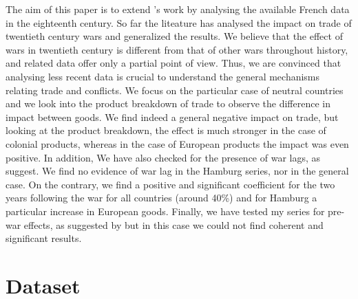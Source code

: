 \documentclass[12pt,a4paper,titlepage,english]{article}
\begin{document}
The aim of this paper is to extend \cite{riley_seven_1986}’s work by analysing the available French data in the eighteenth century. So far the liteature has analysed the impact on trade of twentieth century wars and generalized the results. We believe that the effect of wars in twentieth century is different from that of other wars throughout history, and related data offer only a partial point of view. Thus, we are convinced that analysing less recent data is crucial to understand the general mechanisms relating trade and conflicts. We focus on the particular case of neutral countries and we look into the product breakdown of trade to observe the difference in impact between goods. We find indeed a general negative impact on trade, but looking at the product breakdown, the effect is much stronger in the case of colonial products, whereas in the case of European products the impact was even positive. In addition, We have also checked for the presence of war lags, as \cite{glick2010collateral} suggest. We find no evidence of war lag in the Hamburg series, nor in the general case. On the contrary, we find a positive and significant coefficient for the two years following the war for all countries (around 40\%) and for Hamburg a particular increase in European goods. Finally, we have tested my series for pre-war effects, as suggested by \cite{riley_seven_1986} but in this case we could not find coherent and significant results.  

\section{Dataset}
\end{document}
